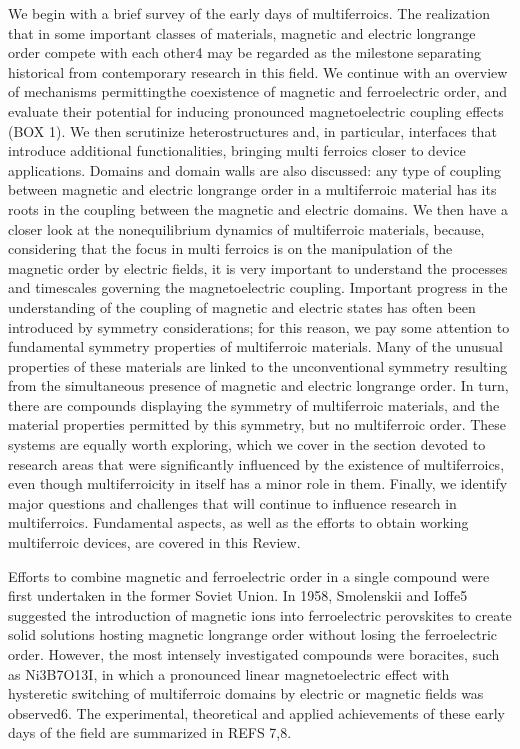We begin with a brief survey of the early days of multi­ferroics. The realization that in some important classes of materials, magnetic and electric long­range order compete with each other4 may be regarded as the milestone separating historical from contemporary research in this field. We continue with an overview of mechanisms permittingthe coexistence of magnetic and ferroelectric order, and evaluate their potential for inducing pronounced magnetoelectric coupling effects (BOX 1). We then scrutinize heterostructures and, in particular, interfaces that introduce additional functionalities, bringing multi ferroics closer to device applications. Domains and domain walls are also discussed: any type of coupling between magnetic and electric long­range order in a multiferroic material has its roots in the coupling between the magnetic and electric domains. We then have a closer look at the non­equilibrium dynamics of multiferroic materials, because, considering that the focus in multi ferroics is on the manipulation of the magnetic order by electric fields, it is very important to understand the processes and timescales governing the magnetoelectric coupling. Important progress in the understanding of the coupling of magnetic and electric states has often been introduced by symmetry considerations; for this reason, we pay some attention to fundamental symmetry properties of multiferroic materials. Many of the unusual properties of these materials are linked to the unconventional symmetry resulting from the simultaneous presence of magnetic and electric long­range order. In turn, there are compounds displaying the symmetry of multiferroic materials, and the material properties permitted by this symmetry, but no multiferroic order. These systems are equally worth exploring, which we cover in the section devoted to research areas that were significantly influenced by the existence of multiferroics, even though multiferroicity in itself has a minor role in them. Finally, we identify major questions and challenges that will continue to influence research in multiferroics. Fundamental aspects, as well as the efforts to obtain working multiferroic devices, are covered in this Review.

Efforts to combine magnetic and ferroelectric order in a single compound were first undertaken in the former Soviet Union. In 1958, Smolenskii and Ioffe5 suggested the introduction of magnetic ions into ferroelectric perovskites to create solid solutions hosting magnetic long­range order without losing the ferroelectric order. However, the most intensely investigated compounds were  boracites,  such  as  Ni3B7O13I,  in  which  a  pronounced linear magnetoelectric effect with hysteretic switching of multiferroic domains by electric or magnetic fields was observed6. The experimental, theoretical and applied achievements of these early days of the field are summarized in REFS 7,8.


